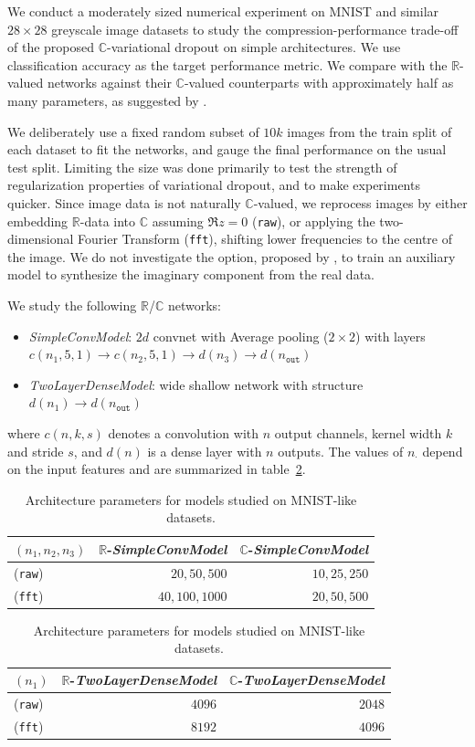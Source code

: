 \documentclass[a4paper,10pt]{article}
\newcommand{\real}{\mathbb{R}}
\newcommand{\cplx}{\mathbb{C}}
\begin{document}
We conduct a moderately sized numerical experiment on MNIST and similar $28\times 28$
greyscale image datasets to study the compression-performance trade-off of the proposed
$\cplx$-variational dropout on simple architectures. We use classification accuracy as
the target performance metric. We compare with the $\real$-valued networks against their
$\cplx$-valued counterparts with approximately half as many parameters, as suggested
by \citet{monning_evaluation_2018}.

We deliberately use a {fixed} random subset of $10k$ images from the train split of each
dataset to fit the networks, and gauge the final performance on the usual test split.
Limiting the size was done primarily to test the strength of regularization properties
of variational dropout, and to make experiments quicker.
Since image data is not naturally $\cplx$-valued, we reprocess images by either embedding
$\real$-data into $\cplx$ assuming $\Re z = 0$ (\texttt{raw}), or applying the two-dimensional
Fourier Transform (\texttt{fft}), shifting lower frequencies to the centre of the image. We
do not investigate the option, proposed by \citet{trabelsi_deep_2017}, to train an auxiliary
model to synthesize the imaginary component from the real data.

We study the following $\real$/$\cplx$ networks:
\begin{itemize}
  \item \textit{SimpleConvModel}: $2d$ convnet with Average pooling ($2\times 2$)
  with layers $c(n_1, 5, 1) \to c(n_2, 5, 1) \to d(n_3) \to d(n_\mathtt{out})$
  \item \textit{TwoLayerDenseModel}: wide shallow network with structure
  $d(n_1) \to d(n_\mathtt{out})$
\end{itemize}
where $c(n, k, s)$ denotes a convolution with $n$ output channels, kernel width $k$ and
stride $s$, and $d(n)$ is a dense layer with $n$ outputs. The values of $n_\cdot$ depend
on the input features and are summarized in table~\ref{tbl:mnist-like-model-spec}.
\begin{table}[hb]
  \centering
  \caption{Architecture parameters for models studied on MNIST-like datasets.}
  \label{tbl:mnist-like-model-spec}
  \begin{tabular}{lrr}
    \toprule
    $(n_1, n_2, n_3)$  & $\real$-\textit{SimpleConvModel} & $\cplx$-\textit{SimpleConvModel} \\
    \midrule
    (\texttt{raw}) & $20, 50, 500$ & $10, 25, 250$ \\
    (\texttt{fft}) & $40, 100, 1000$ & $20, 50, 500$ \\
    \bottomrule
  \end{tabular}
  \begin{tabular}{lrr}
    \toprule
    $(n_1)$  & $\real$-\textit{TwoLayerDenseModel} & $\cplx$-\textit{TwoLayerDenseModel} \\
    \midrule
    (\texttt{raw}) & $4096$ & $2048$ \\
    (\texttt{fft}) & $8192$ & $4096$ \\
    \bottomrule
  \end{tabular}
\end{table}
\end{document}
